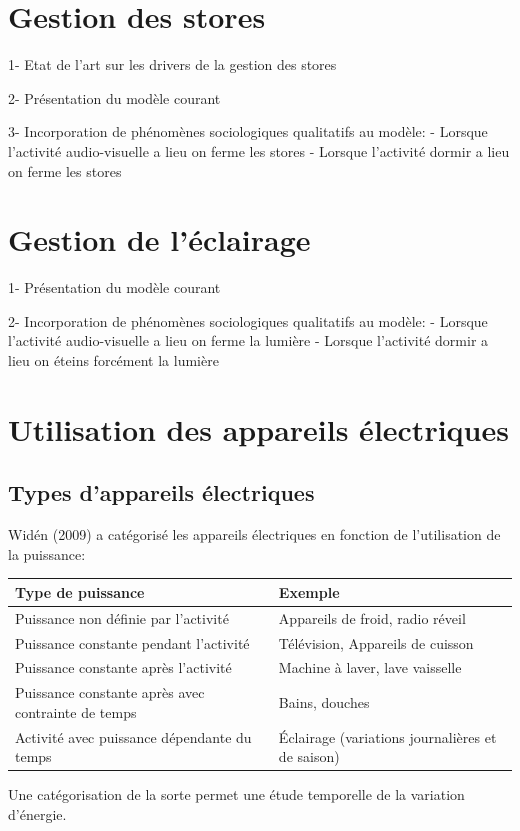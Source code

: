 \section{Gestion des stores}

1- Etat de l'art sur les drivers de la gestion des stores

2- Présentation du modèle courant

3- Incorporation de phénomènes sociologiques qualitatifs au modèle:
	- Lorsque l'activité audio-visuelle a lieu on ferme les stores
	- Lorsque l'activité dormir a lieu on ferme les stores
	
\section{Gestion de l'éclairage}

1- Présentation du modèle courant

2- Incorporation de phénomènes sociologiques qualitatifs au modèle:
	- Lorsque l'activité audio-visuelle a lieu on ferme la lumière
	- Lorsque l'activité dormir a lieu on éteins forcément la lumière

\section{Utilisation des appareils électriques}

\subsection{Types d'appareils électriques}

Widén (2009) a catégorisé les appareils électriques en fonction de l'utilisation de la puissance:
\begin{table} [H]
\centering
\begin{tabular}{l|l}
Type de puissance & Exemple \\
\hline
Puissance non définie par l'activité & Appareils de froid, radio réveil \\
Puissance constante pendant l'activité & Télévision, Appareils de cuisson \\
Puissance constante après l'activité & Machine à laver, lave vaisselle \\
Puissance constante après avec contrainte de temps & Bains, douches \\
Activité avec puissance dépendante du temps & Éclairage (variations journalières et de saison) \\
\end{tabular}
\end{table}
Une catégorisation de la sorte permet une étude temporelle de la variation d'énergie.


